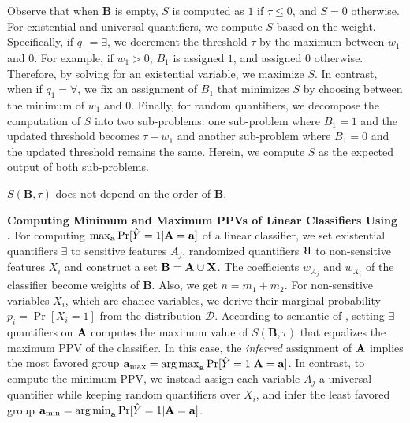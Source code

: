 Observe that when $ \textbf{B} $ is empty, $S$ is computed as $ 1 $ if $ \tau \le 0 $, and  $ S = 0 $ otherwise. For  existential and universal quantifiers, we compute $ S $ based on the weight. Specifically, if $ q_1 = \exists $, we decrement the threshold $ \tau $ by the maximum between $ w_1 $ and $ 0 $. For example, if $ w_1 > 0 $, $ B_1 $ is assigned $ 1 $, and assigned $ 0 $ otherwise. Therefore, by solving for an existential variable, we  maximize $ S $. In contrast, when if $ q_1 = \forall $, we fix an assignment of $ B_1 $ that minimizes $ S $ by choosing between the minimum of $ w_1 $ and $ 0 $. Finally, for random quantifiers, we decompose the computation of $S$ into two sub-problems: one sub-problem where $ B_1 = 1 $ and the updated threshold becomes $ \tau - w_1 $ and another sub-problem where $ B_1 = 0 $ and the updated threshold remains the same. Herein, we compute $ S $ as the expected output of both sub-problems.

\begin{remark}
	\label{fairness_fvgm_lm:property_s3p}
	$ S(\mathbf{B},\tau) $ does not depend on the order of $ \mathbf{B} $.
\end{remark}

\textbf{Computing Minimum and Maximum PPVs of Linear Classifiers Using  {\stochastic}.} For computing $ \max_{ \mathbf{a}} \Pr[\hat{Y} =1 | \mathbf{A} = \mathbf{a}] $ of a linear classifier, we set existential quantifiers $ \exists $ to sensitive features $ A_j $, randomized quantifiers $ \R $ to non-sensitive features $ X_i $ and construct a set $ \mathbf{B} = \mathbf{A} \cup \mathbf{X} $.  The coefficients $ w_{A_j} $ and $ w_{X_i} $ of the classifier become weights of $ \mathbf{B} $. Also, we get $n=m_1 +m_2$. For non-sensitive variables $ X_i $, which are chance variables, we derive their marginal probability $ p_i = \Pr[X_i = 1] $ from the distribution $ \mathcal{D} $.  According to semantic of {\stochastic}, setting $ \exists $ quantifiers on $ \mathbf{A} $ computes the maximum value of $ S(\mathbf{B}, \tau) $ that equalizes the maximum PPV of the classifier. In this case, the \textit{inferred} assignment of $ \mathbf{A} $ implies the most favored group $ \mathbf{a}_{{\max}} =  \operatorname*{arg\,max}_{ \mathbf{a}} \Pr[\hat{Y} =1 | \mathbf{A} = \mathbf{a}] $. In contrast, to compute the minimum PPV, we instead assign each variable  $ A_j $ a universal  quantifier  while keeping random quantifiers over $ X_i $, and infer the least favored group $ \mathbf{a}_{{\min}} =  \operatorname*{arg\,min}_{ \mathbf{a}} \Pr[\hat{Y} =1 | \mathbf{A} = \mathbf{a}] $.

